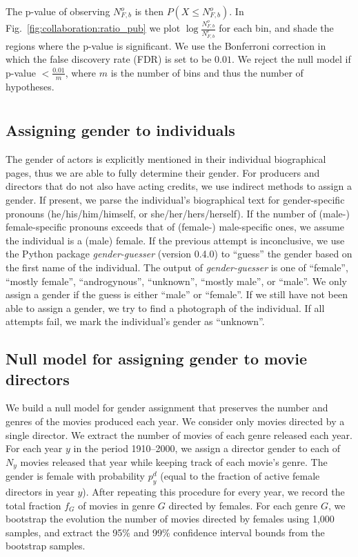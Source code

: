 \noindent
The p-value of observing $N_{F,b}^o$ is then $P(X\leq N_{F,b}^o)$. In Fig.~\ref{fig:collaboration:ratio_pub} we plot $\log\frac{N_{F,b}^o}{N_{F,b}^e}$ for each bin, and shade the regions where the p-value is significant. We use the Bonferroni correction in which the false discovery rate (FDR) is set to be $0.01$. We reject the null model if p-value $<\frac{0.01}{m}$, where $m$ is the number of bins and thus the number of hypotheses.


\section{}
\label{sec:methods:movies}

\subsection{Assigning gender to individuals}

The gender of actors is explicitly mentioned in their individual biographical pages, thus we are able to fully determine their gender. For producers and directors that do not also have acting credits, we use indirect methods to assign a gender. If present, we parse the individual's biographical text for gender-specific pronouns (he/his/him/himself, or she/her/hers/herself). If the number of (male-) female-specific pronouns exceeds that of (female-) male-specific ones, we assume the individual is a (male) female. If the previous attempt is inconclusive, we use the Python package \textit{gender-guesser} (version 0.4.0) \cite{Gender2016} to ``guess'' the gender based on the first name of the individual. The output of \textit{gender-guesser} is one of ``female'', ``mostly female'', ``androgynous'', ``unknown'', ``mostly male'', or ``male''. We only assign a gender if the guess is either ``male'' or ``female''. If we still have not been able to assign a gender, we try to find a photograph of the individual. If all attempts fail, we mark the individual's gender as ``unknown''.


\subsection{Null model for assigning gender to movie directors}

We build a null model for gender assignment that preserves the number and genres of the movies produced each year. We consider only movies directed by a single director. We extract the number of movies of each genre released each year. For each year $y$ in the period 1910--2000, we assign a director gender to each of $N_y$ movies released that year while keeping track of each movie's genre. The gender is female with probability $p^d_y$ (equal to the fraction of active female directors in year $y$). After repeating this procedure for every year, we record the total fraction $f_G$ of movies in genre $G$ directed by females. For each genre $G$, we bootstrap the evolution the number of movies directed by females using 1,000 samples, and extract the 95\% and 99\% confidence interval bounds from the bootstrap samples.


